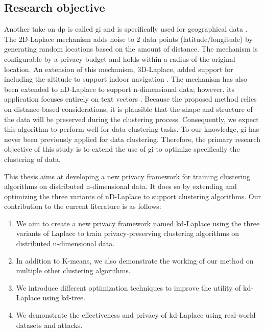 \subsection*{Research objective}
Another take on \gls{dp} is called \gls{gi} and is specifically used for geographical data  \citep{DBLP:journals/corr/abs-1212-1984}.
The 2D-Laplace mechanism adds noise to 2 data points (latitude/longitude) by generating random locations based on the amount of distance.
The mechanism is configurable by a privacy budget and holds within a radius of the original location.
An extension of this mechanism, 3D-Laplace, added support for including the altitude to support indoor navigation \citep{9646489}.
The mechanism has also been extended to nD-Laplace to support n-dimensional data; however, its application focuses entirely on text vectors \citep{fernandes_generalised_2019}. \newline
Because the proposed method relies on distance-based considerations, it is plausible that the shape and structure of the data will be preserved during the clustering process.
Consequently, we expect this algorithm to perform well for data clustering tasks.
To our knowledge, \gls{gi} has never been previously applied for data clustering.
Therefore, the primary research objective of this study is to extend the use of \gls{gi} to optimize specifically the clustering of data. \newline

This thesis aims at developing a new privacy framework for training clustering algorithms on distributed n-dimensional data.
It does so by extending and optimizing the three variants of nD-Laplace to support clustering algorithms.
Our contribution to the current literature is as follows:
\begin{enumerate}
  \item We aim to create a new privacy framework named kd-Laplace using the three variants of Laplace to train privacy-preserving clustering algorithms on distributed n-dimensional data.
  \item In addition to K-means, we also demonstrate the working of our method on multiple other clustering algorithms.
  \item We introduce different optimization techniques to improve the utility of kd-Laplace using kd-tree.
  \item We demonstrate the effectiveness and privacy of kd-Laplace using real-world datasets and attacks.
\end{enumerate}

